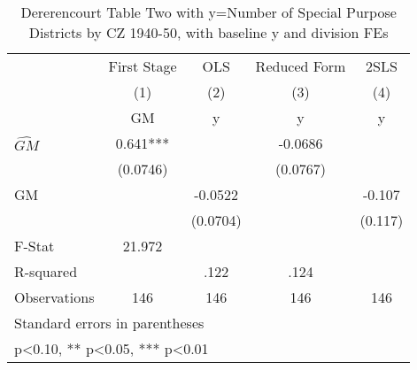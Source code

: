 \begin{table}[htbp]\centering
\def\sym#1{\ifmmode^{#1}\else\(^{#1}\)\fi}
\caption{Dererencourt Table Two with y=Number of Special Purpose Districts by CZ 1940-50, with baseline y and division FEs}
\begin{tabular}{l*{4}{c}}
\toprule
                    & First Stage   &         OLS   &Reduced Form   &        2SLS   \\
                    &\multicolumn{1}{c}{(1)}&\multicolumn{1}{c}{(2)}&\multicolumn{1}{c}{(3)}&\multicolumn{1}{c}{(4)}\\
                    &\multicolumn{1}{c}{GM}&\multicolumn{1}{c}{y}&\multicolumn{1}{c}{y}&\multicolumn{1}{c}{y}\\
\midrule
$\hat{GM}$          &       0.641***&               &     -0.0686   &               \\
                    &    (0.0746)   &               &    (0.0767)   &               \\
\addlinespace
GM                  &               &     -0.0522   &               &      -0.107   \\
                    &               &    (0.0704)   &               &     (0.117)   \\
\midrule
F-Stat              &      21.972   &               &               &               \\
R-squared           &               &        .122   &        .124   &               \\
Observations        &         146   &         146   &         146   &         146   \\
\bottomrule
\multicolumn{5}{l}{\footnotesize Standard errors in parentheses}\\
\multicolumn{5}{l}{\footnotesize * p<0.10, ** p<0.05, *** p<0.01}\\
\end{tabular}
\end{table}
